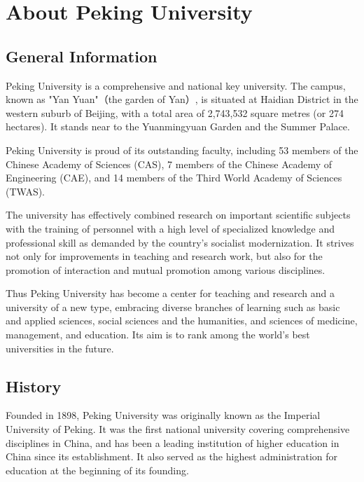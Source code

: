 \chapter*{About Peking University} 
\mtcaddchapter
\vspace{-5em}

\section*{General Information}
Peking University is a comprehensive and national key university. The campus, known as "Yan Yuan"（the garden of Yan）, is situated at Haidian District in the western suburb of Beijing, with a total area of 2,743,532 square metres (or 274 hectares). It stands near to the Yuanmingyuan Garden and the Summer Palace.

Peking University is proud of its outstanding faculty, including 53 members of the Chinese Academy of Sciences (CAS), 7 members of the Chinese Academy of Engineering (CAE), and 14 members of the Third World Academy of Sciences (TWAS).

The university has effectively combined research on important scientific subjects with the training of personnel with a high level of specialized knowledge and professional skill as demanded by the country's socialist modernization. It strives not only for improvements in teaching and research work, but also for the promotion of interaction and mutual promotion among various disciplines.  

Thus Peking University has become a center for teaching and research and a university of a new type, embracing diverse branches of learning such as basic and applied sciences, social sciences and the humanities, and sciences of medicine, management, and education. Its aim is to rank among the world's best universities in the future. 

\section*{History}
Founded in 1898, Peking University was originally known as the Imperial University of Peking. It was the first national university covering comprehensive disciplines in China, and has been a leading institution of higher education in China since its establishment. It also served as the highest administration for education at the beginning of its founding. 


